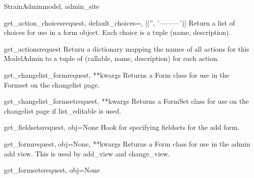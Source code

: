 \documentclass[letterpaper,10pt,english]{sphinxmanual}
\begin{document}
\begin{classdesc}{StrainAdmin}{model, admin\_site}
\hypertarget{animal.admin.StrainAdmin.get_action_choices}{}\begin{methoddesc}{get\_action\_choices}{request, default\_choices=, {[}('', '---------'){]}}
Return a list of choices for use in a form object.  Each choice is a
tuple (name, description).
\end{methoddesc}

\hypertarget{animal.admin.StrainAdmin.get_actions}{}\begin{methoddesc}{get\_actions}{request}
Return a dictionary mapping the names of all actions for this
ModelAdmin to a tuple of (callable, name, description) for each action.
\end{methoddesc}

\hypertarget{animal.admin.StrainAdmin.get_changelist_form}{}\begin{methoddesc}{get\_changelist\_form}{request, **kwargs}
Returns a Form class for use in the Formset on the changelist page.
\end{methoddesc}

\hypertarget{animal.admin.StrainAdmin.get_changelist_formset}{}\begin{methoddesc}{get\_changelist\_formset}{request, **kwargs}
Returns a FormSet class for use on the changelist page if list\_editable
is used.
\end{methoddesc}

\hypertarget{animal.admin.StrainAdmin.get_fieldsets}{}\begin{methoddesc}{get\_fieldsets}{request, obj=None}
Hook for specifying fieldsets for the add form.
\end{methoddesc}

\hypertarget{animal.admin.StrainAdmin.get_form}{}\begin{methoddesc}{get\_form}{request, obj=None, **kwargs}
Returns a Form class for use in the admin add view. This is used by
add\_view and change\_view.
\end{methoddesc}

\hypertarget{animal.admin.StrainAdmin.get_formsets}{}\begin{methoddesc}{get\_formsets}{request, obj=None}\end{methoddesc}


\end{classdesc}
\end{document}
